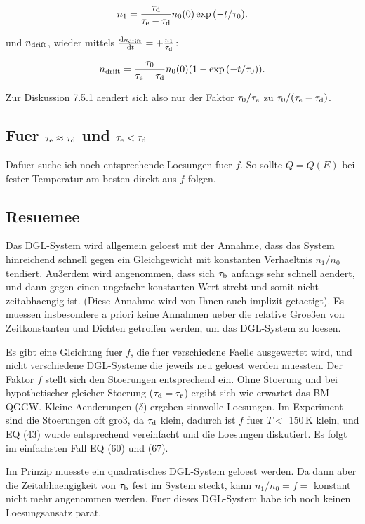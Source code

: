 \begin{equation}
 n_1 = \frac{\tau_{\textrm{d}}}{\tau_\textrm{e} - \tau_{\textrm{d}}} n_0(0) \exp{(-t / \tau_{0})}. 
\end{equation}

\noindent
und $n_{{\textrm{drift}}}$, wieder mittels $\frac{\mathrm d n_{{\textrm{drift}}}}{\mathrm d t} = + \frac{n_1}{\tau_{\textrm{d}}}$:

\begin{equation}
 n_{{\textrm{drift}}} = \frac{\tau_{0}}{\tau_\textrm{e} - \tau_{\textrm{d}}} n_0(0) (1 - \exp{(-t / \tau_{0})}). 
\end{equation}

\noindent
Zur Diskussion 7.5.1 aendert sich also nur der Faktor $\tau_{0} / \tau_\textrm{e}$ zu $\tau_{0} / (\tau_\textrm{e} - \tau_{\textrm{d}})$. 

\subsection{Fuer $\tau_\textrm{e} \approx \tau_{\textrm{d}}$ und $\tau_\textrm{e} < \tau_{\textrm{d}}$}
Dafuer suche ich noch entsprechende Loesungen fuer $f$. 
So sollte $Q=Q(E)$ bei fester Temperatur am besten direkt aus $f$ folgen. 

\subsection{Resuemee}
Das DGL-System wird allgemein geloest mit der Annahme, dass das System hinreichend schnell gegen ein Gleichgewicht mit konstanten Verhaeltnis $n_1/n_0$ tendiert. 
Au3erdem wird angenommen, dass sich $\tau_{\textrm{b}}$ anfangs sehr schnell aendert, und dann gegen einen ungefaehr konstanten Wert strebt und somit nicht zeitabhaengig ist. 
(Diese Annahme wird von Ihnen auch implizit getaetigt). 
Es muessen insbesondere a priori keine Annahmen ueber die relative Groe3en von Zeitkonstanten und Dichten getroffen werden, um das DGL-System zu loesen. 

Es gibt eine Gleichung fuer $f$, die fuer verschiedene Faelle ausgewertet wird, und nicht verschiedene DGL-Systeme die jeweils neu geloest werden muessten. 
Der Faktor $f$ stellt sich den Stoerungen entsprechend ein. 
Ohne Stoerung und bei hypothetischer gleicher Stoerung ($\tau_{\textrm{d}} = \tau_\textrm{r}$) ergibt sich wie erwartet das BM-QGGW. 
Kleine Aenderungen ($\delta$) ergeben sinnvolle Loesungen. 
Im Experiment sind die Stoerungen oft gro3, da $\tau_{\textrm{d}}$ klein, dadurch ist $f$ fuer $T < $ 150\,K klein, und EQ (43) wurde entsprechend vereinfacht und die Loesungen diskutiert. 
Es folgt im einfachsten Fall EQ (60) und (67). 

Im Prinzip muesste ein quadratisches DGL-System geloest werden. 
Da dann aber die Zeitabhaengigkeit von $\tau_{\textrm{b}}$ fest im System steckt, kann $n_1/n_0 = f = $ konstant nicht mehr angenommen werden. 
Fuer dieses DGL-System habe ich noch keinen Loesungsansatz parat. 





